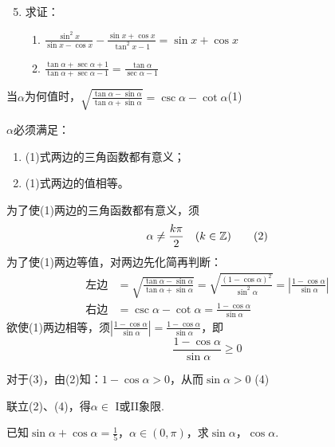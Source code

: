 \begin{enumerate}\setcounter{enumi}{4}
    \item 求证：
\begin{enumerate}[(1)]
    \item $\frac{\sin^2 x}{\sin x-\cos x}-\frac{\sin x+\cos x}{\tan^2 x-1}=\sin x+\cos x$
    \item $\frac{\tan\alpha+\sec\alpha+1}{\tan\alpha+\sec\alpha-1}=\frac{\tan\alpha}{\sec\alpha-1}$
\end{enumerate}
\end{enumerate}

\begin{example}
     当$\alpha$为何值时，$\sqrt{\frac{\tan\alpha-\sin\alpha}{\tan\alpha+\sin\alpha}}=\csc\alpha-\cot\alpha$\hfill(1)
\end{example}

\begin{analyze}
$\alpha$必须满足：
\begin{enumerate}
    \item (1)式两边的三角函数都有意义；
    \item (1)式两边的值相等。
\end{enumerate}
\end{analyze}

\begin{solution}
    为了使(1)两边的三角函数都有意义，须
\begin{equation}
    \alpha\ne \dfrac{k\pi}{2}\quad (k\in\mathbb{Z})\tag{2}
\end{equation}
为了使(1)两边等值，对两边先化简再判断：
\[\begin{split}
    \text{左边}&=\sqrt{\frac{\tan\alpha-\sin\alpha}{\tan\alpha+\sin\alpha}}=\sqrt{\frac{(1-\cos\alpha)^2}{\sin^2\alpha}}=\left|\frac{1-\cos\alpha}{\sin\alpha}\right|\\
\text{右边}&=\csc\alpha-\cot\alpha=\frac{1-\cos\alpha}{\sin\alpha}    
\end{split}\]
欲使(1)两边相等，须$\left|\frac{1-\cos\alpha}{\sin\alpha}\right|=\frac{1-\cos\alpha}{\sin\alpha}$，即
\begin{equation}
    \frac{1-\cos\alpha}{\sin\alpha}\ge 0 \tag{3}
\end{equation}

对于(3)，由(2)知：$1-\cos\alpha>0$，从而$\sin\alpha>0$
     \hfill(4)

联立(2)、(4)，得$\alpha\in$ I或II象限.
\end{solution}

\begin{example}
已知$\sin\alpha+\cos\alpha=\frac{1}{5}$，$\alpha\in(0,\pi)$，求$\sin\alpha$，$\cos\alpha$.
\end{example}

